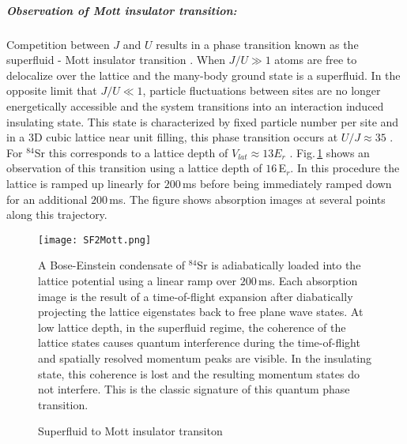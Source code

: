 \subparagraph{Observation of Mott insulator transition:}
Competition between $J$ and $U$ results in a phase transition known as the superfluid - Mott insulator transition \cite{Fisher1989,Greiner2002}.
When $J/U \gg 1$ atoms are free to delocalize over the lattice and the many-body ground state is a superfluid.
In the opposite limit that $J/U \ll 1$, particle fluctuations between sites are no longer energetically accessible and the system transitions into an interaction induced insulating state.
This state is characterized by fixed particle number per site and in a 3D cubic lattice near unit filling, this phase transition occurs at $U/J \approx 35$ \cite{Blakie2004}.
For $^{84}$Sr this corresponds to a lattice depth of $V_{lat} \approx 13E_r$ \cite{Fisher1989}.
Fig.\,\ref{fig:mottSFTransition} shows an observation of this transition using a lattice depth of $16$\,E$_r$.
In this procedure the lattice is ramped up linearly for $200\,$ms before being immediately ramped down for an additional $200\,$ms.
The figure shows absorption images at several points along this trajectory.
	\begin{figure} 
		\centerline{
		\texttt{[image: SF2Mott.png]}}
		\caption{Superfluid to Mott insulator transiton}{A Bose-Einstein condensate of $^{84}$Sr is adiabatically loaded into the lattice potential using a linear ramp over $200$\,ms. Each absorption image is the result of a time-of-flight expansion after diabatically projecting the lattice eigenstates back to free plane wave states. At low lattice depth, in the superfluid regime, the coherence of the lattice states causes quantum interference during the time-of-flight and spatially resolved momentum peaks are visible. In the insulating state, this coherence is lost and the resulting momentum states do not interfere. This is the classic signature of this quantum phase transition.}
		\label{fig:mottSFTransition}
	\end{figure}


